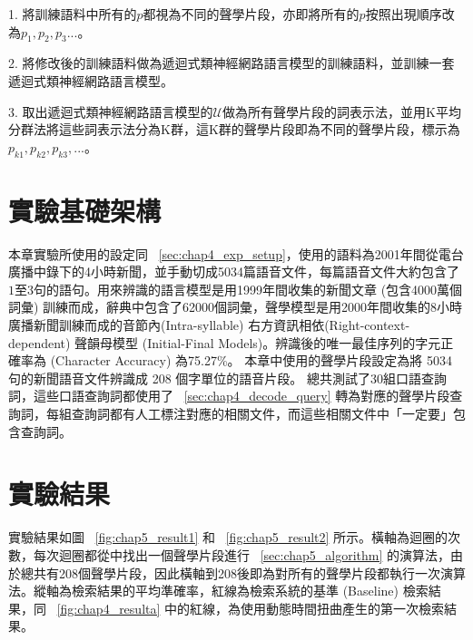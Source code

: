 1. 將訓練語料中所有的$p$都視為不同的聲學片段，亦即將所有的$p$按照出現順序改為$p_1, p_2, p_3...$。

2. 將修改後的訓練語料做為遞迴式類神經網路語言模型的訓練語料，並訓練一套遞迴式類神經網路語言模型。

3. 取出遞迴式類神經網路語言模型的$\mathcal{U}$做為所有聲學片段的詞表示法，並用K平均分群法將這些詞表示法分為K群，這K群的聲學片段即為不同的聲學片段，標示為$p_{k1}, p_{k2}, p_{k3}, ...$。


\section{實驗基礎架構}
本章實驗所使用的設定同 ~\ref{sec:chap4_exp_setup}，使用的語料為2001年間從電台廣播中錄下的4小時新聞，並手動切成5034篇語音文件，每篇語音文件大約包含了$1至3$句的語句。用來辨識的語言模型是用1999年間收集的新聞文章 (包含4000萬個詞彙)
訓練而成，辭典中包含了62000個詞彙，聲學模型是用2000年間收集的8小時廣播新聞訓練而成的音節內(Intra-syllable) 右方資訊相依(Right-context-dependent) 聲韻母模型 (Initial-Final Models)。辨識後的唯一最佳序列的字元正確率為 (Character Accuracy) 為75.27\%。
本章中使用的聲學片段設定為將 5034 句的新聞語音文件辨識成 208 個字單位的語音片段。
總共測試了30組口語查詢詞，這些口語查詢詞都使用了 ~\ref{sec:chap4_decode_query} 轉為對應的聲學片段查詢詞，每組查詢詞都有人工標注對應的相關文件，而這些相關文件中「一定要」包含查詢詞。

\section{實驗結果}
實驗結果如圖 ~\ref{fig:chap5_result1} 和 ~\ref{fig:chap5_result2} 所示。橫軸為迴圈的次數，每次迴圈都從中找出一個聲學片段進行 ~\ref{sec:chap5_algorithm} 的演算法，由於總共有208個聲學片段，因此橫軸到208後即為對所有的聲學片段都執行一次演算法。縱軸為檢索結果的平均準確率，紅線為檢索系統的基準 (Baseline) 檢索結果，同 ~\ref{fig:chap4_resulta} 中的紅線，為使用動態時間扭曲產生的第一次檢索結果。 

